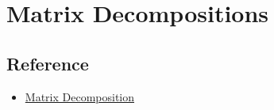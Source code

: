 \chapter{Matrix Decompositions}

\section{Reference}

\begin{itemize}
    \item \href{http://users.ece.northwestern.edu/~mya671/files/Matrix_YM_.pdf}{Matrix Decomposition}
\end{itemize}
